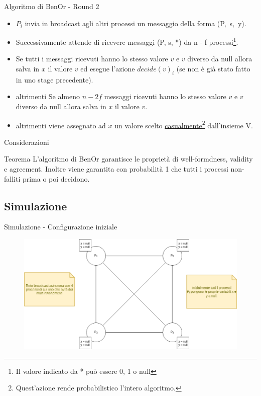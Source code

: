 \documentclass{beamer}
\begin{document}
    \begin{frame}{Algoritmo di BenOr - Round 2}

        \begin{itemize}
            \item $P_{i}$ invia in broadcast agli altri processi un messaggio della forma \mbox{(P, s, y)}.

            \item Successivamente attende di ricevere messaggi (P, s, *) da n - f processi\footnote{Il valore indicato da * può essere 0, 1 o null}.

            \item Se tutti i messaggi ricevuti hanno lo stesso valore $v$ e $v$ diverso da null allora salva in $x$ il valore $v$ ed esegue l'azione $decide(v)_{i}$ (se non è già stato fatto in uno stage precedente).

            \item altrimenti Se almeno $n - 2f$ messaggi ricevuti hanno lo stesso valore $v$ e $v$ diverso da null allora salva in $x$ il valore $v$.

            \item altrimenti viene assegnato ad $x$ un valore scelto \underline{casualmente}\footnote{Quest'azione rende probabilistico l'intero algoritmo.} dall'insieme V.
        \end{itemize}
    \end{frame}



\begin{frame}{Considerazioni}
    \begin{block}{Teorema}
        L'algoritmo di BenOr garantisce le proprietà di well-formdness, validity e agreement. Inoltre viene garantita con probabilità 1 che tutti i processi non-falliti prima o poi decidono.
    \end{block}
\end{frame}

\subsection{Simulazione}
\begin{frame}{Simulazione - Configurazione iniziale}
\begin{figure}
    \centering
    \includegraphics[scale=0.35]{simulazione/simulazione1.png}
\end{figure}
\end{frame}
\end{document}
